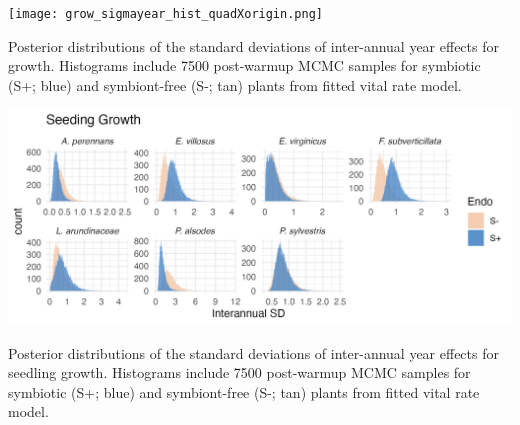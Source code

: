 \documentclass[lineno, sn-basic]{sn-jnl}%
\providecommand{\DIFaddbegin}{} %
\providecommand{\DIFaddend}{} %
\providecommand{\DIFdelbegin}{} %
\providecommand{\DIFdelend}{} %
\providecommand{\DIFaddbeginFL}{} %
\providecommand{\DIFaddendFL}{} %
\providecommand{\DIFdelbeginFL}{} %
\providecommand{\DIFdelendFL}{} %
\newcommand{\DIFscaledelfig}{0.5}
\newlength{\DIFdelgraphicswidth} %
\newlength{\DIFdelgraphicsheight} %
\newcommand{\DIFaddincludegraphics}[2][]{{\color{blue}\fbox{\DIFOincludegraphics[#1]{#2}}}} %
\newcommand{\DIFdelincludegraphics}[2][]{%
\sbox{\DIFdelgraphicsbox}{\DIFOincludegraphics[#1]{#2}}%
\settoboxwidth{\DIFdelgraphicswidth}{\DIFdelgraphicsbox} %
\settoboxtotalheight{\DIFdelgraphicsheight}{\DIFdelgraphicsbox} %
\scalebox{\DIFscaledelfig}{%
\parbox[b]{\DIFdelgraphicswidth}{\usebox{\DIFdelgraphicsbox}\\[-\baselineskip] \rule{\DIFdelgraphicswidth}{0em}}\llap{\resizebox{\DIFdelgraphicswidth}{\DIFdelgraphicsheight}{%
\setlength{\unitlength}{\DIFdelgraphicswidth}%
\begin{picture}(1,1)%
\thicklines\linethickness{2pt} %
{\color[rgb]{1,0,0}\put(0,0){\framebox(1,1){}}}%
{\color[rgb]{1,0,0}\put(0,0){\line( 1,1){1}}}%
{\color[rgb]{1,0,0}\put(0,1){\line(1,-1){1}}}%
\end{picture}%
}\hspace*{3pt}}} %
} %
\DeclareRobustCommand{\DIFaddbegin}{\DIFOaddbegin \let\includegraphics\DIFaddincludegraphics} %
\DeclareRobustCommand{\DIFaddend}{\DIFOaddend \let\includegraphics\DIFOincludegraphics} %
\DeclareRobustCommand{\DIFdelbegin}{\DIFOdelbegin \let\includegraphics\DIFdelincludegraphics} %
\DeclareRobustCommand{\DIFdelend}{\DIFOaddend \let\includegraphics\DIFOincludegraphics} %
\DeclareRobustCommand{\DIFaddbeginFL}{\DIFOaddbeginFL \let\includegraphics\DIFaddincludegraphics} %
\DeclareRobustCommand{\DIFaddendFL}{\DIFOaddendFL \let\includegraphics\DIFOincludegraphics} %
\DeclareRobustCommand{\DIFdelbeginFL}{\DIFOdelbeginFL \let\includegraphics\DIFdelincludegraphics} %
\DeclareRobustCommand{\DIFdelendFL}{\DIFOaddendFL \let\includegraphics\DIFOincludegraphics} %
\begin{document}
\DIFdelbegin %
\DIFdelendFL \DIFaddbeginFL \begin{myfigure}[H]
	\DIFaddendFL \centering
	\DIFdelbeginFL %
\DIFdelendFL \DIFaddbeginFL \texttt{[image: grow\_sigmayear\_hist\_quadXorigin.png]}
	\caption[Posterior distributions of the standard deviations of inter-annual year effects for growth]{\DIFaddendFL Posterior distributions of the standard deviations of inter-annual year effects for growth. Histograms include 7500 post-warmup MCMC samples for symbiotic (S+; blue) and symbiont-free (S-; tan) plants from fitted vital rate model.}
\DIFdelbeginFL %
\DIFdelend \DIFaddbegin \end{myfigure}
\DIFaddend 


\DIFdelbegin %
\DIFdelendFL \DIFaddbeginFL \begin{myfigure}[H]
	\DIFaddendFL \centering
	\includegraphics[width=.9\linewidth]{seedgrow_sigmayear_hist.png}
	\DIFdelbeginFL %
\DIFdelendFL \DIFaddbeginFL \caption[Posterior distributions of the standard deviations of inter-annual year effects for seedling growth]{\DIFaddendFL Posterior distributions of the standard deviations of inter-annual year effects for seedling growth. Histograms include 7500 post-warmup MCMC samples for symbiotic (S+; blue) and symbiont-free (S-; tan) plants from fitted vital rate model.}
\DIFdelbeginFL %
\DIFdelend \DIFaddbegin \end{myfigure}
\DIFaddend 
\end{document}
